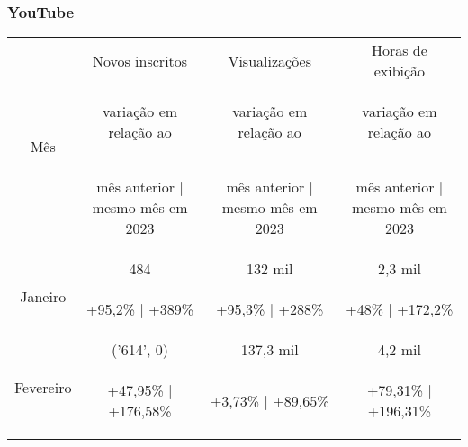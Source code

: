 \documentclass{article}%
\begin{document}
\subsubsection*{YouTube}%
\label{ssubsec:YouTube}%
\begin{minipage}{\textwidth}%
\centering%
\begin{tabular}{@{}|c|c|c|c|@{}}%
\toprule%
\multirow{3}{*}{Mês}&Novos inscritos&Visualizações&Horas de exibição\\%
&\begin{footnotesize}%
variação em relação ao%
\end{footnotesize}&\begin{footnotesize}%
variação em relação ao%
\end{footnotesize}&\begin{footnotesize}%
variação em relação ao%
\end{footnotesize}\\%
&\begin{footnotesize}%
mês anterior | mesmo mês em 2023%
\end{footnotesize}&\begin{footnotesize}%
mês anterior | mesmo mês em 2023%
\end{footnotesize}&\begin{footnotesize}%
mês anterior | mesmo mês em 2023%
\end{footnotesize}\\%
\midrule%
\multirow{2}{*}{Janeiro}&484&132 mil&2,3 mil\\%
&\begin{footnotesize}%
+95,2\% | +389\%%
\end{footnotesize}&\begin{footnotesize}%
+95,3\% | +288\%%
\end{footnotesize}&\begin{footnotesize}%
+48\% | +172,2\%%
\end{footnotesize}\\%
\midrule%
\multirow{2}{*}{Fevereiro}&('614', 0) &137,3 mil&4,2 mil\\%
&\begin{footnotesize}%
+47,95\% | +176,58\%%
\end{footnotesize}&\begin{footnotesize}%
+3,73\% | +89,65\%%
\end{footnotesize}&\begin{footnotesize}%
+79,31\% | +196,31\%%
\end{footnotesize}\\\bottomrule%
%
\end{tabular}%
\end{minipage}
\end{document}
